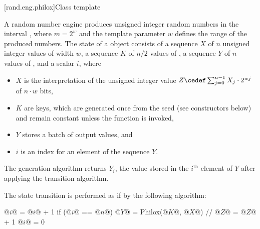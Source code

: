 [rand.eng.philox]{Class template }%
%

\pnum
A  random number engine produces
unsigned integer random numbers in the interval ,
where $m = 2^w$ and
the template parameter $w$ defines the range of the produced numbers.
The state of a  object consists of
a sequence $X$ of $n$ unsigned integer values of width $w$,
a sequence $K$ of $n/2$ values of ,
a sequence $Y$ of $n$ values of , and
a scalar $i$, where
\begin{itemize}
\item
$X$ is the interpretation of the unsigned integer  value
$Z \cedef \sum_{j = 0}^{n - 1} X_j \cdot 2^{wj}$ of $n \cdot w$ bits,
\item
$K$ are keys, which are generated once from the seed (see constructors below)
and remain constant unless the  function is invoked,
\item
$Y$ stores a batch of output values, and
\item
$i$ is an index for an element of the sequence $Y$.
\end{itemize}

\pnum
The generation algorithm returns $Y_i$,
the value stored in the $i^\text{th}$ element of $Y$ after applying
the transition algorithm.

\pnum
The state transition is performed as if by the following algorithm:
\begin{codeblock}
@$i$@ = @$i$@ + 1
if (@$i$@ == @$n$@) {
  @$Y$@ = Philox(@$K$@, @$X$@) // \seebelow
  @$Z$@ = @$Z$@ + 1
  @$i$@ = 0
}
\end{codeblock}

